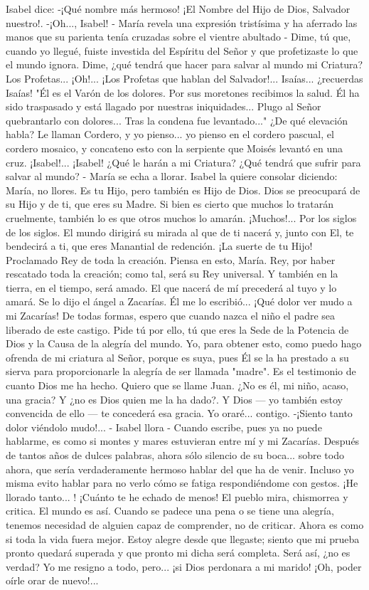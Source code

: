 \documentclass[12pt]{book} %
\begin{document}
Isabel dice: 
-¡Qué nombre más hermoso! ¡El Nombre del Hijo de Dios, Salvador nuestro!. 
-¡Oh..., Isabel! - María revela una expresión tristísima y ha aferrado las manos que su parienta tenía cruzadas sobre el 
vientre abultado - Dime, tú que, cuando yo llegué, fuiste investida del Espíritu del Señor y que profetizaste lo que el mundo ignora. Dime, ¿qué tendrá que hacer para salvar al mundo mi Criatura? Los Profetas... ¡Oh!... ¡Los Profetas que hablan del Salvador!... Isaías... ¿recuerdas Isaías! "Él es el Varón de los dolores. Por sus moretones recibimos la salud. Él ha sido traspasado y está llagado por nuestras iniquidades... Plugo al Señor quebrantarlo con dolores... Tras la condena fue levantado..." ¿De qué elevación habla? Le llaman Cordero, y yo pienso... yo pienso en el cordero pascual, el cordero mosaico, y concateno esto con la serpiente que Moisés levantó en una cruz. ¡Isabel!... ¡Isabel! ¿Qué le harán a mi Criatura? ¿Qué tendrá que sufrir para salvar al mundo? - María se echa a llorar. 
Isabel la quiere consolar diciendo: 
María, no llores. Es tu Hijo, pero también es Hijo de Dios. Dios se preocupará de su Hijo y de ti, que eres su Madre. Si 
bien es cierto que muchos lo tratarán cruelmente, también lo es que otros muchos lo amarán. ¡Muchos!... Por los siglos de los siglos. El mundo dirigirá su mirada al que de ti nacerá y, junto con El, te bendecirá a ti, que eres Manantial de redención. ¡La suerte de tu Hijo! Proclamado Rey de toda la creación. Piensa en esto, María. Rey, por haber rescatado toda la creación; como tal, será su Rey universal. Y también en la tierra, en el tiempo, será amado. El que nacerá de mí precederá al tuyo y lo amará. Se lo dijo el ángel a Zacarías. Él me lo escribió... ¡Qué dolor ver mudo a mi Zacarías! De todas formas, espero que cuando nazca el niño el padre sea liberado de este castigo. Pide tú por ello, tú que eres la Sede de la Potencia de Dios y la Causa de la alegría del mundo. Yo, para obtener esto, como puedo hago ofrenda de mi criatura al Señor, porque es suya, pues Él se la ha prestado a su sierva para proporcionarle la alegría de ser llamada "madre". Es el testimonio de cuanto Dios me ha hecho. Quiero que se llame Juan. ¿No es él, mi niño, acaso, una gracia? Y ¿no es Dios quien me la ha dado?. 
Y Dios — yo también estoy convencida de ello — te concederá esa gracia. Yo oraré... contigo. 
-¡Siento tanto dolor viéndolo mudo!... - Isabel llora - Cuando escribe, pues ya no puede hablarme, es como si montes y 
mares estuvieran entre mí y mi Zacarías. Después de tantos años de dulces palabras, ahora sólo silencio de su boca... sobre todo ahora, que sería verdaderamente hermoso hablar del que ha de venir. Incluso yo misma evito hablar para no verlo cómo se fatiga respondiéndome con gestos. ¡He llorado tanto... ! ¡Cuánto te he echado de menos! El pueblo mira, chismorrea y critica. El mundo es así. Cuando se padece una pena o se tiene una alegría, tenemos necesidad de alguien capaz de comprender, no de criticar. Ahora es como si toda la vida fuera mejor. Estoy alegre desde que llegaste; siento que mi prueba pronto quedará superada y que pronto mi dicha será completa. Será así, ¿no es verdad? Yo me resigno a todo, pero... ¡si Dios perdonara a mi marido! ¡Oh, poder oírle orar de nuevo!... 
\end{document}

